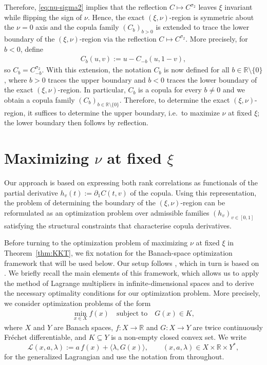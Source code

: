 \documentclass{article}
\newcommand{\1}{\mathds{1}}
\newcommand{\R}{\mathbb{R}}
\begin{document}
Therefore, \eqref{eq:nu-sigma2} implies that the reflection $C\mapsto C^{\sigma_2}$ leaves $\xi$ invariant while flipping the sign of $\nu$.
Hence, the exact $(\xi,\nu)$-region is symmetric about the $\nu=0$ axis and the copula family $(C_b)_{b>0}$ is extended to trace the lower boundary of the $(\xi,\nu)$-region via the reflection $C\mapsto C^{\sigma_2}$.
More precisely, for $b<0$, define
\begin{align}\label{eq:reflection}
C_b(u,v):=u-C_{-b}(u,1-v),
\end{align}
so $C_b=C_{-b}^{\sigma_2}$.
With this extension, the notation \(C_b\) is now defined for all \(b\in\R\setminus\{0\}\), where \(b>0\) traces the upper boundary and \(b<0\) traces the lower boundary of the exact \((\xi,\nu)\)-region.
In particular, $C_b$ is a copula for every $b\ne 0$ and we obtain a copula family $(C_b)_{b\in\R\setminus\{0\}}$.
Therefore, to determine the exact \((\xi,\nu)\)-region, it suffices to determine the upper boundary, i.e.\ to maximize \(\nu\) at fixed \(\xi\); the lower boundary then follows by reflection.

\section{\texorpdfstring{Maximizing $\nu$ at fixed $\xi$}{Maximizing nu at fixed xi}}
\label{sec:optimization}

Our approach is based on expressing both rank correlations as functionals of the partial derivative $h_v(t) := \partial_1 C(t,v)$ of the copula.
Using this representation, the problem of determining the boundary of the $(\xi,\nu)$-region can be reformulated as an optimization problem over admissible families $(h_v)_{v\in[0,1]}$ satisfying the structural constraints that characterise copula derivatives.

Before turning to the optimization problem of maximizing $\nu$ at fixed $\xi$ in Theorem~\ref{thm:KKT}, we fix notation for the Banach-space optimization framework that will be used below. Our setup follows \cite[App.~A]{rockel2025exact}, which in turn is based on \cite[Ch.~3]{bonnans2013perturbation}. We briefly recall the main elements of this framework, which allows us to apply the method of Lagrange multipliers in infinite-dimensional spaces and to derive the necessary optimality conditions for our optimization problem.
More precisely, we consider optimization problems of the form
\begin{align}\label{eq:p}
  \min_{x\in X} f(x)
  \quad\text{subject to}\quad
  G(x)\in K,
\end{align}
where $X$ and $Y$ are Banach spaces, $f:X\to\R$ and $G:X\to Y$ are twice continuously Fr\'echet differentiable, and $K\subseteq Y$ is a non-empty closed convex set. We write
\[
  \mathcal{L}(x,a,\lambda)
  := a\,f(x)+\langle \lambda,G(x)\rangle,
  \qquad (x,a,\lambda)\in X\times\R\times Y^*,
\]
for the generalized Lagrangian and use the notation from \cite[App.~A]{rockel2025exact} throughout.
\end{document}
